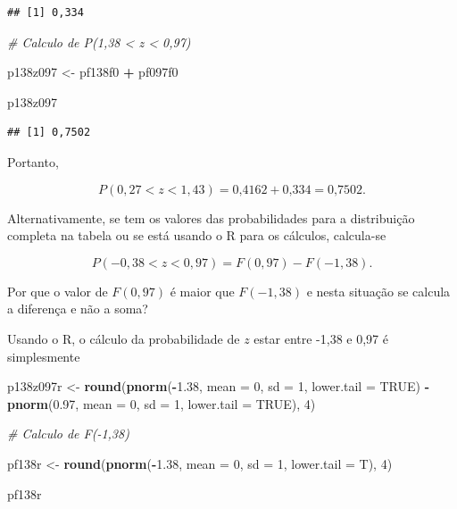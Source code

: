 \documentclass[
]{book}
\newenvironment{Shaded}{\begin{snugshade}}{\end{snugshade}}
\newcommand{\CommentTok}[1]{\textcolor[rgb]{0.56,0.35,0.01}{\textit{#1}}}
\newcommand{\DataTypeTok}[1]{\textcolor[rgb]{0.13,0.29,0.53}{#1}}
\newcommand{\DecValTok}[1]{\textcolor[rgb]{0.00,0.00,0.81}{#1}}
\newcommand{\FloatTok}[1]{\textcolor[rgb]{0.00,0.00,0.81}{#1}}
\newcommand{\KeywordTok}[1]{\textcolor[rgb]{0.13,0.29,0.53}{\textbf{#1}}}
\newcommand{\NormalTok}[1]{#1}
\newcommand{\OperatorTok}[1]{\textcolor[rgb]{0.81,0.36,0.00}{\textbf{#1}}}
\newcommand{\OtherTok}[1]{\textcolor[rgb]{0.56,0.35,0.01}{#1}}
\newcommand{\StringTok}[1]{\textcolor[rgb]{0.31,0.60,0.02}{#1}}
\begin{document}
\begin{verbatim}
## [1] 0,334
\end{verbatim}

\begin{Shaded}
\begin{Highlighting}[]
\CommentTok{# Calculo de P(1,38 < z < 0,97)}

\NormalTok{p138z097 <-}\StringTok{ }\NormalTok{pf138f0 }\OperatorTok{+}\StringTok{ }\NormalTok{pf097f0}

\NormalTok{p138z097}
\end{Highlighting}
\end{Shaded}

\begin{verbatim}
## [1] 0,7502
\end{verbatim}

Portanto,

\[
  P(0,27 < z < 1,43) = \text{0,4162} + \text{0,334} = \text{0,7502}.
\]

Alternativamente, se tem os valores das probabilidades para a distribuição completa na tabela ou se está usando o R para os cálculos, calcula-se

\[
  P(-0,38 < z < 0,97) = F(0,97) - F(-1,38).
\]

Por que o valor de \(F(0,97)\) é maior que \(F(-1,38)\) e nesta situação se calcula a diferença e não a soma?

Usando o R, o cálculo da probabilidade de \(z\) estar entre -1,38 e 0,97 é simplesmente

\begin{Shaded}
\begin{Highlighting}[]
\NormalTok{p138z097r <-}\StringTok{ }\KeywordTok{round}\NormalTok{(}\KeywordTok{pnorm}\NormalTok{(}\OperatorTok{-}\FloatTok{1.38}\NormalTok{, }\DataTypeTok{mean =} \DecValTok{0}\NormalTok{, }\DataTypeTok{sd =} \DecValTok{1}\NormalTok{, }\DataTypeTok{lower.tail =} \OtherTok{TRUE}\NormalTok{) }\OperatorTok{-}\StringTok{ }
\StringTok{    }\KeywordTok{pnorm}\NormalTok{(}\FloatTok{0.97}\NormalTok{, }\DataTypeTok{mean =} \DecValTok{0}\NormalTok{, }\DataTypeTok{sd =} \DecValTok{1}\NormalTok{, }\DataTypeTok{lower.tail =} \OtherTok{TRUE}\NormalTok{), }
    \DecValTok{4}\NormalTok{)}

\CommentTok{# Calculo de F(-1,38)}

\NormalTok{pf138r <-}\StringTok{ }\KeywordTok{round}\NormalTok{(}\KeywordTok{pnorm}\NormalTok{(}\OperatorTok{-}\FloatTok{1.38}\NormalTok{, }\DataTypeTok{mean =} \DecValTok{0}\NormalTok{, }\DataTypeTok{sd =} \DecValTok{1}\NormalTok{, }\DataTypeTok{lower.tail =}\NormalTok{ T), }
    \DecValTok{4}\NormalTok{)}

\NormalTok{pf138r}
\end{Highlighting}
\end{Shaded}
\end{document}
